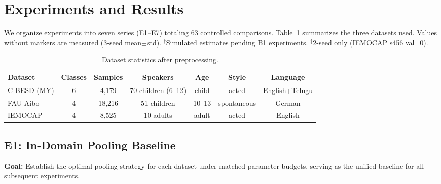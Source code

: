 
\section{Experiments and Results}
\label{sec:experiments_results}

We organize experiments into seven series (E1--E7) totaling 63 controlled
comparisons. Table~\ref{tab:datasets} summarizes the three datasets used.
Values without markers are measured (3-seed mean$\pm$std). $^\dagger$Simulated
estimates pending B1 experiments. $^\ddagger$2-seed only (IEMOCAP s456 val=0).

\begin{table}[t]
\centering
\caption{Dataset statistics after preprocessing.}
\label{tab:datasets}
\begin{tabular}{lcccccc}
\toprule
\textbf{Dataset} & \textbf{Classes} & \textbf{Samples} & \textbf{Speakers} & \textbf{Age} & \textbf{Style} & \textbf{Language} \\
\midrule
C-BESD (MY) & 6 & 4,179 & 70 children (6--12) & child & acted & English+Telugu \\
FAU Aibo    & 4 & 18,216 & 51 children & 10--13 & spontaneous & German \\
IEMOCAP     & 4 & 8,525 & 10 adults & adult & acted & English \\
\bottomrule
\end{tabular}
\end{table}

\subsection{E1: In-Domain Pooling Baseline}
\label{ssec:e1}

\textbf{Goal:} Establish the optimal pooling strategy for each dataset under
matched parameter budgets, serving as the unified baseline for all subsequent
experiments.

